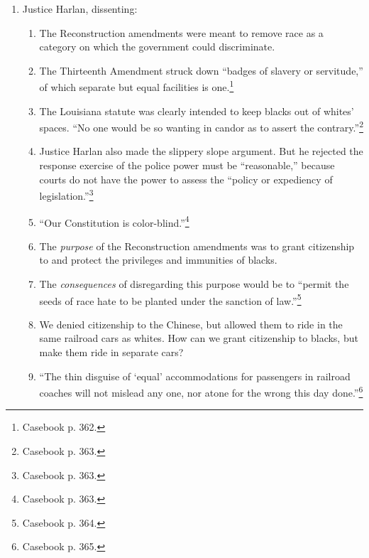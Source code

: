 \begin{enumerate}
\begin{enumerate}
        reversed that whites would be oppressed. It also assumed (wrongly) that 
        social prejudices can be overcome through legislation.\footnote{Casebook 
        p. 361.}
        \item The question of ``the proportion of colored blood necessary to 
        constitute a colored person'' was not at issue here.
    \end{enumerate}
    \item Justice Harlan, dissenting:
    \begin{enumerate}
        \item The Reconstruction amendments were meant to remove race as a 
        category on which the government could discriminate.
        \item The Thirteenth Amendment struck down ``badges of slavery or 
        servitude,'' of which separate but equal facilities is 
        one.\footnote{Casebook p. 362.}
        \item The Louisiana statute was clearly intended to keep blacks out of 
        whites' spaces. ``No one would be so wanting in candor as to assert the 
        contrary.''\footnote{Casebook p. 363.}
        \item Justice Harlan also made the slippery slope argument. But he 
        rejected the response exercise of the police power must be 
        ``reasonable,'' because courts do not have the power to assess the 
        ``policy or expediency of legislation.''\footnote{Casebook p. 363.}
        \item ``Our Constitution is color-blind.''\footnote{Casebook p. 363.} 
        \item The \emph{purpose} of the Reconstruction amendments was to grant 
        citizenship to and protect the privileges and immunities of blacks.
        \item The \emph{consequences} of disregarding this purpose would be to 
        ``permit the seeds of race hate to be planted under the sanction of 
        law.''\footnote{Casebook p. 364.}
        \item We denied citizenship to the Chinese, but allowed them to ride in 
        the same railroad cars as whites. How can we grant citizenship to 
        blacks, but make them ride in separate cars?
        \item ``The thin disguise of `equal' accommodations for passengers in 
        railroad coaches will not mislead any one, nor atone for the wrong this 
        day done.''\footnote{Casebook p. 365.}
    \end{enumerate}
\end{enumerate}
